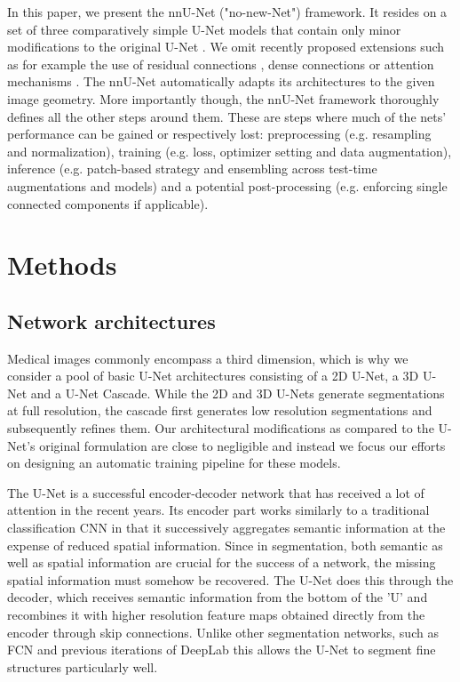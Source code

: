 \documentclass{templates/llncs} %
\begin{document}
    In this paper, we present the nnU-Net ("no-new-Net") framework. It resides on a set of three comparatively simple U-Net models that contain only minor modifications to the original U-Net \cite{ronneberger2015u}. We omit recently proposed extensions such as for example the use of residual connections \cite{he2016identity,milletari2016v}, dense connections \cite{jegou2017one} or attention mechanisms \cite{oktay2018attention}. The nnU-Net automatically adapts its architectures to the given image geometry. More importantly though, the nnU-Net framework thoroughly defines all the other steps around them. These are steps where much of the nets' performance can be gained or respectively lost: preprocessing (e.g. resampling and normalization), training (e.g. loss, optimizer setting and data augmentation), inference (e.g. patch-based strategy and ensembling across test-time augmentations and models) and a potential post-processing (e.g. enforcing single connected components if applicable).





\section{Methods}
    \label{methods}
    \subsection{Network architectures}
    \label{networkarchitecture}
    
    Medical images commonly encompass a third dimension, which is why we consider a pool of basic U-Net architectures consisting of a 2D U-Net, a 3D U-Net and a U-Net Cascade. While the 2D and 3D U-Nets generate segmentations at full resolution, the cascade first generates low resolution segmentations and subsequently refines them. Our architectural modifications as compared to the U-Net's original formulation are close to negligible and instead we focus our efforts on designing an automatic training pipeline for these models.
    
    The U-Net \cite{ronneberger2015u} is a successful encoder-decoder network that has received a lot of attention in the recent years. Its encoder part works similarly to a traditional classification CNN in that it successively aggregates semantic information at the expense of reduced spatial information. Since in segmentation, both semantic as well as spatial information are crucial for the success of a network, the missing spatial information must somehow be recovered. The U-Net does this through the decoder, which receives semantic information from the bottom of the 'U' and recombines it with higher resolution feature maps obtained directly from the encoder through skip connections. Unlike other segmentation networks, such as FCN \cite{long2015fully} and previous iterations of DeepLab \cite{chen2018deeplab} this allows the U-Net to segment fine structures particularly well.
    
\end{document}
